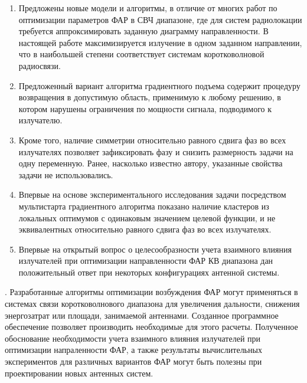 \begin{enumerate}
  \item Предложены новые модели и алгоритмы, в отличие от многих работ по оптимизации параметров ФАР в СВЧ диапазоне, где для систем радиолокации требуется аппроксимировать заданную диаграмму направленности. В настоящей работе максимизируется излучение в одном заданном направлении, что в наибольшей степени соответствует системам коротковолновой радиосвязи.
  \item Предложенный вариант алгоритма градиентного подъема содержит процедуру возвращения в допустимую область, применимую к любому решению, в котором нарушены ограничения по мощности сигнала, подводимого к излучателю.
  \item Кроме того, наличие симметрии относительно равного сдвига фаз во всех излучателях позволяет зафиксировать фазу и снизить размерность задачи на одну переменную. Ранее, насколько известно  автору, указанные свойства задачи не использовались.
  \item Впервые на основе экспериментального исследования задачи посредством мультистарта градиентного алгоритма показано наличие кластеров из локальных оптимумов с одинаковым значением целевой функции, и не эквивалентных относительно равного сдвига фаз во всех излучателях.
  \item Впервые на открытый вопрос о целесообразности учета взаимного влияния излучателей при оптимизации направленности ФАР КВ диапазона дан положительный ответ при некоторых конфигурациях антенной системы.
\end{enumerate}


{\influence}.
Разработанные алгоритмы оптимизации возбуждения ФАР могут  применяться в системах связи коротковолнового диапазона для увеличения дальности, снижения энергозатрат или площади, занимаемой антеннами. Созданное программное обеспечение позволяет производить необходимые для этого расчеты.
Полученное обоснование необходимости учета взаимного влияния излучателей при оптимизации напраленности ФАР, а также результаты вычислительных экспериментов для различных вариантов ФАР могут быть полезны при проектировании новых антенных систем.

